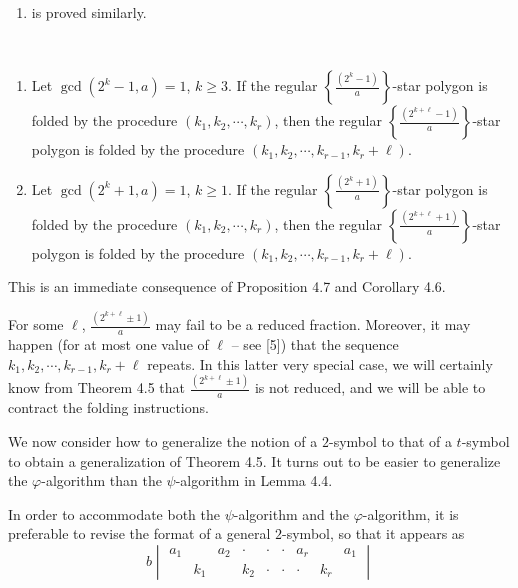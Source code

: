 \begin{description}
\begin{enumerate}[\hspace{1cm}(i)]
      \item is proved similarly.
    \end{enumerate}

  \item[Corollary 4.8:] $\ $
    \begin{enumerate}[\hspace{1cm}(i)]
      \item Let $\gcd(2^{k}-1,a) = 1$, $k \geq 3$. If the regular $\left\{ \frac{(2^{k}-1)}{a} \right\}$-star polygon is folded by the procedure $(k_{1}, k_{2}, \cdots, k_{r})$, then the regular $\left\{ \frac{(2^{k+\ell}-1)}{a} \right\}$-star polygon is folded by the procedure $(k_{1}, k_{2}, \cdots, k_{r-1}, k_{r}+\ell)$.
      \item Let $\gcd(2^{k}+1,a) = 1$, $k \geq 1$. If the regular $\left\{ \frac{(2^{k}+1)}{a} \right\}$-star polygon is folded by the procedure $(k_{1}, k_{2}, \cdots, k_{r})$, then the regular $\left\{ \frac{(2^{k+\ell}+1)}{a} \right\}$-star polygon is folded by the procedure $(k_{1}, k_{2}, \cdots, k_{r-1}, k_{r}+\ell)$.
    \end{enumerate}

  \item[Proof:] This is an immediate consequence of Proposition 4.7 and Corollary 4.6.

  \item[Remark:] For some $\ell$, $\frac{(2^{k+\ell} \pm 1)}{a}$ may fail to be a reduced fraction. Moreover, it may happen (for at most one value of $\ell$ -- see [5]) that the sequence $k_{1}, k_{2}, \cdots, k_{r-1}, k_{r}+\ell$ repeats. In this latter very special case, we will certainly know from Theorem 4.5 that $\frac{(2^{k+\ell} \pm 1)}{a}$ is not reduced, and we will be able to contract the folding instructions.

\end{description}

We now consider how to generalize the notion of a $2$-symbol to that of a $t$-symbol to obtain a generalization of Theorem 4.5. It turns out to be easier to generalize the $\varphi$-algorithm than the $\psi$-algorithm in Lemma 4.4.

In order to accommodate both the $\psi$-algorithm and the $\varphi$-algorithm, it is preferable to revise the format of a general $2$-symbol, so that it appears as
\begin{equation}
b \begin{vmatrix}
a_{1} &       & a_{2} & \cdot & \cdot & \cdot & a_{r} &       & a_{1} \\
      & k_{1} &       & k_{2} & \cdot & \cdot & \cdot & k_{r} &       
\end{vmatrix}  \tag{4.9}
\end{equation}

